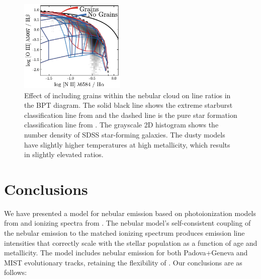 \begin{figure}[!htbp]
  \begin{centering}
    \includegraphics[width=0.45\textwidth]{manuscript/chapter2/f31.pdf}
    \caption{Effect of including grains within the nebular cloud on line ratios in the BPT diagram. The solid black line shows the extreme starburst classification line from \citet{Kewley01} and the dashed line is the pure star formation classification line from \citet{Kauffmann03a}. The grayscale 2D histogram shows the number density of SDSS star-forming galaxies. The dusty models have slightly higher temperatures at high metallicity, which results in slightly elevated \oiiihb{} ratios.}
    \label{fig:dustBPT}
  \end{centering}
\end{figure}

\section{Conclusions}\label{sec:conclusions}

We have presented a model for nebular emission based on photoionization models from \Cloudy and ionizing spectra from \FSPS. The \FSPS nebular model's self-consistent coupling of the nebular emission to the matched ionizing spectrum produces emission line intensities that correctly scale with the stellar population as a function of age and metallicity. The model includes nebular emission for both Padova+Geneva and MIST evolutionary tracks, retaining the flexibility of \FSPS. Our conclusions are as follows:

